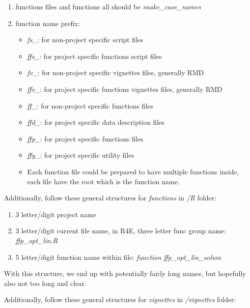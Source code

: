 \documentclass[
]{article}
\providecommand{\tightlist}{%
  \setlength{\itemsep}{0pt}\setlength{\parskip}{0pt}}
\begin{document}
\begin{enumerate}
\def\labelenumi{\arabic{enumi}.}
\tightlist
\item
  functions files and functions all should be \emph{snake\_case\_names}
\item
  function name prefix:

  \begin{itemize}
  \tightlist
  \item
    \emph{fs\_}: for non-project specific script files
  \item
    \emph{ffs\_}: for project specific functions script files
  \item
    \emph{fv\_}: for non-project specific vignettes files, generally RMD
  \item
    \emph{ffv\_}: for project specific functions vignettes files,
    generally RMD
  \item
    \emph{ff\_}: for non-project specific functions files
  \item
    \emph{ffd\_}: for project specific data description files
  \item
    \emph{ffp\_}: for project specific functions files
  \item
    \emph{ffy\_}: for project specific utility files
  \item
    Each function file could be prepared to have multiple functions
    inside, each file have the root which is the function name.
  \end{itemize}
\end{enumerate}

Additionally, follow these general structures for \emph{functions} in
\emph{/R} folder:

\begin{enumerate}
\def\labelenumi{\arabic{enumi}.}
\tightlist
\item
  3 letter/digit project name
\item
  3 letter/digit current file name, in R4E, three letter func group
  name: \emph{ffp\_opt\_lin.R}
\item
  5 letter/digit function name within file: \emph{function
  ffp\_opt\_lin\_solum}
\end{enumerate}

With this structure, we end up with potentially fairly long names, but
hopefully also not too long and clear.

Additionally, follow these general structures for \emph{vignettes} in
\emph{/vignettes} folder:
\end{document}
